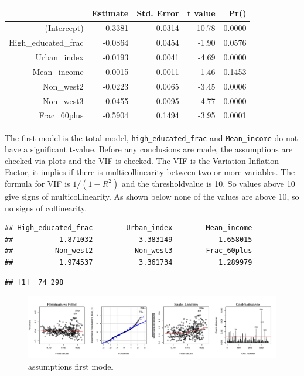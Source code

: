 \documentclass[11pt,]{article}
\begin{document}
\begin{table}[ht]
\centering
\begin{tabular}{rrrrr}
  \hline
 & Estimate & Std. Error & t value & Pr() \\ 
  \hline
(Intercept) & 0.3381 & 0.0314 & 10.78 & 0.0000 \\ 
  High\_educated\_frac & -0.0864 & 0.0454 & -1.90 & 0.0576 \\ 
  Urban\_index & -0.0193 & 0.0041 & -4.69 & 0.0000 \\ 
  Mean\_income & -0.0015 & 0.0011 & -1.46 & 0.1453 \\ 
  Non\_west2 & -0.0223 & 0.0065 & -3.45 & 0.0006 \\ 
  Non\_west3 & -0.0455 & 0.0095 & -4.77 & 0.0000 \\ 
  Frac\_60plus & -0.5904 & 0.1494 & -3.95 & 0.0001 \\ 
   \hline
\end{tabular}
\end{table}

The first model is the total model, \texttt{high\_educated\_frac} and
\texttt{Mean\_income} do not have a significant t-value. Before any
conclusions are made, the assumptions are checked via plots and the VIF
is checked. The VIF is the Variation Inflation Factor, it implies if
there is multicollinearity between two or more variables. The formula
for VIF is \(1/(1-R^2)\) and the thresholdvalue is 10. So values above
10 give signs of multicollinearity. As shown below none of the values
are above 10, so no signs of collinearity.

\begin{verbatim}
## High_educated_frac        Urban_index        Mean_income 
##           1.871032           3.383149           1.658015 
##          Non_west2          Non_west3        Frac_60plus 
##           1.974537           3.361734           1.289979
\end{verbatim}

\begin{verbatim}
## [1]  74 298
\end{verbatim}

\begin{figure}[H]

{\centering \includegraphics{Report_files/figure-latex/unnamed-chunk-9-1} 

}

\caption{\label{afm}assumptions first model}\label{fig:unnamed-chunk-9}
\end{figure}
\end{document}
